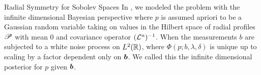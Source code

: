 \begin{chapter}{Radial Symmetry for Sobolev Spaces}
In , we modeled the problem with the infinite dimensional Bayesian perspective where $p$ is assumed apriori to be a Gaussian random variable taking on values in the Hilbert space of radial profiles $\mathscr P$ with mean 0 and covariance operator $(\mathcal L^n)^{-1}$.
When the measurements $b$ are subjected to a white noise process on $L^2(\mathbb R)$, 
where $\Phi(p;b,\lambda,\delta)$ is unique up to scaling by a factor dependent only on $\mbox{\boldmath$b$}$.
We called this the infinite dimensional posterior for $p$ given $\mbox{\boldmath$b$}$.

\end{chapter}

